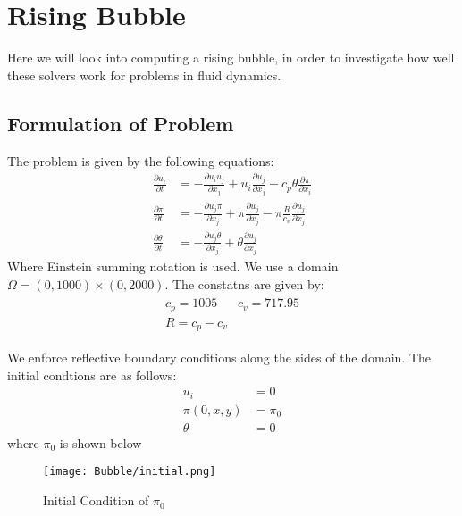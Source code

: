 \section{Rising Bubble}

Here we will look into computing a rising bubble, in order to investigate how well these solvers work for problems in fluid dynamics.
\subsection{Formulation of Problem}
The problem is given by the following equations\cite{Bryan2002}:
\begin{align*}
    \frac{\partial u_i}{\partial t} &= -\frac{\partial u_i u_j}{\partial x_j} + u_i\frac{\partial u_j}{\partial x_j} - c_p \theta \frac{\partial \pi}{\partial x_i} \\
    \frac{\partial \pi}{\partial t} &= -\frac{\partial u_j \pi}{\partial x_j} + \pi\frac{\partial u_j}{\partial x_j} - \pi \frac{R}{c_v}\frac{\partial u_j}{\partial x_j} \\
    \frac{\partial \theta}{\partial t} &= -\frac{\partial u_j \theta}{\partial x_j} + \theta\frac{\partial u_j}{\partial x_j}
\end{align*}
Where Einstein summing notation is used.
We use a domain $\Omega = (0,1000) \times (0,2000)$.
The constatns are given by:
\begin{align*}
    \begin{matrix}
    c_p = 1005 & c_v = 717.95 \\
    R = c_p - c_v 
    \end{matrix}
\end{align*}

We enforce reflective boundary conditions along the sides of the domain.
The initial condtions are as follows:
\begin{align*}
    u_i &= 0\\
    \pi(0,x,y) &= \pi_0\\
    \theta &= 0
\end{align*}
where $\pi_0$ is shown below
\begin{figure}[H]
    \centering
    \begin{minipage}{1\textwidth}
        \texttt{[image: Bubble/initial.png]} %
        \caption{Initial Condition of $\pi_0$}
        \label{fig:first order 8 0.5}
    \end{minipage}
\end{figure}
